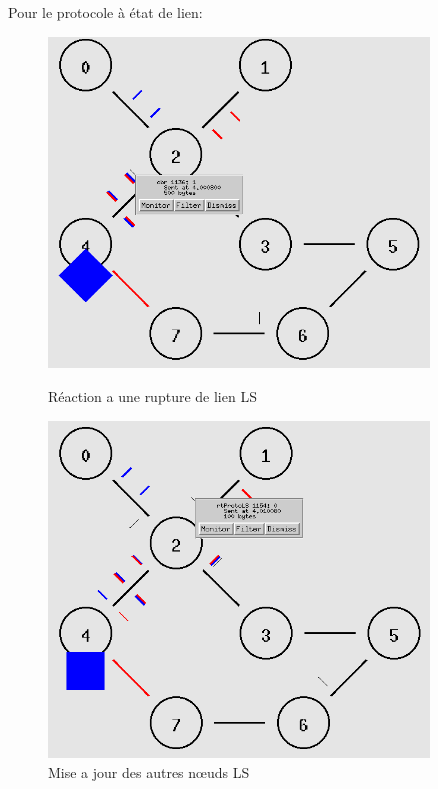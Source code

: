 \documentclass[11pt]{article}
\begin{document}
Pour le protocole à état de lien:

\begin{figure}[H]
    \begin{minipage}[c]{.5\linewidth}
        \centering
        \includegraphics[width=0.9\textwidth]{assets/tp2/ruptureLS.png}
        \caption{Réaction a une rupture de lien LS}
        \label{ruptureLS}
    \end{minipage}
    \hfill%
    \begin{minipage}[c]{.5\linewidth}
        \centering
        \includegraphics[width=0.9\textwidth]{assets/tp2/envoiInfoRuptureAuxautresLS.png}
        \caption{Mise a jour des autres nœuds LS}
        \label{infoAutres}
    \end{minipage}
\end{figure}
\end{document}
